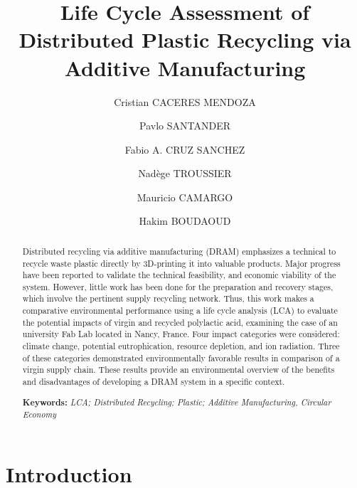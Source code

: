 \documentclass[12pt]{elsarticle} %
\begin{document}
\begin{frontmatter}

  \title{Life Cycle Assessment of Distributed Plastic Recycling via Additive Manufacturing}
    \author[UL]{Cristian CACERES MENDOZA%
  }
    \author[USACH]{Pavlo SANTANDER%
  }
  
    \author[UL]{Fabio A. CRUZ SANCHEZ%
  }
  
    \author[CREIDD]{Nadège TROUSSIER%
  }
  
    \author[UL]{Mauricio CAMARGO%
  }
  
    \author[UL]{Hakim BOUDAOUD%
  }
  
  
  \begin{abstract}
  Distributed recycling via additive manufacturing (DRAM) emphasizes a technical to recycle waste plastic directly by 3D-printing it into valuable products. Major progress have been reported to validate the technical feasibility, and economic viability of the system. However, little work has been done for the preparation and recovery stages, which involve the pertinent supply recycling network. Thus, this work makes a comparative environmental performance using a life cycle analysis (LCA) to evaluate the potential impacts of virgin and recycled polylactic acid, examining the case of an university Fab Lab located in Nancy, France. Four impact categories were considered: climate change, potential eutrophication, resource depletion, and ion radiation. Three of these categories demonstrated environmentally favorable results in comparison of a virgin supply chain. These results provide an environmental overview of the benefits and disadvantages of developing a DRAM system in a specific context.

  \textbf{Keywords:} \emph{LCA; Distributed Recycling; Plastic; Additive Manufacturing, Circular Economy}
  \end{abstract}
  
 \end{frontmatter}

\hypertarget{introduction}{%
\section{Introduction}\label{introduction}}
\end{document}
